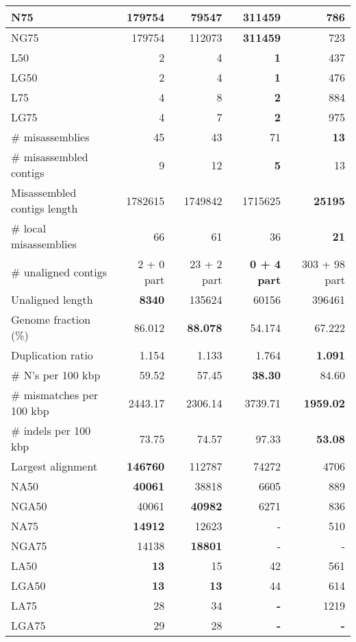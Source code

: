 \documentclass[12pt,a4paper]{article}
\begin{document}
\begin{table}[ht]
\begin{center}
\begin{tabular}{|l*{4}{|r}|}
N75 & 179754 & 79547 & {\bf 311459} & 786 \\ \hline
NG75 & 179754 & 112073 & {\bf 311459} & 723 \\ \hline
L50 & 2 & 4 & {\bf 1} & 437 \\ \hline
LG50 & 2 & 4 & {\bf 1} & 476 \\ \hline
L75 & 4 & 8 & {\bf 2} & 884 \\ \hline
LG75 & 4 & 7 & {\bf 2} & 975 \\ \hline
\# misassemblies & 45 & 43 & 71 & {\bf 13} \\ \hline
\# misassembled contigs & 9 & 12 & {\bf 5} & 13 \\ \hline
Misassembled contigs length & 1782615 & 1749842 & 1715625 & {\bf 25195} \\ \hline
\# local misassemblies & 66 & 61 & 36 & {\bf 21} \\ \hline
\# unaligned contigs & 2 + 0 part & 23 + 2 part & {\bf 0 + 4 part} & 303 + 98 part \\ \hline
Unaligned length & {\bf 8340} & 135624 & 60156 & 396461 \\ \hline
Genome fraction (\%) & 86.012 & {\bf 88.078} & 54.174 & 67.222 \\ \hline
Duplication ratio & 1.154 & 1.133 & 1.764 & {\bf 1.091} \\ \hline
\# N's per 100 kbp & 59.52 & 57.45 & {\bf 38.30} & 84.60 \\ \hline
\# mismatches per 100 kbp & 2443.17 & 2306.14 & 3739.71 & {\bf 1959.02} \\ \hline
\# indels per 100 kbp & 73.75 & 74.57 & 97.33 & {\bf 53.08} \\ \hline
Largest alignment & {\bf 146760} & 112787 & 74272 & 4706 \\ \hline
NA50 & {\bf 40061} & 38818 & 6605 & 889 \\ \hline
NGA50 & 40061 & {\bf 40982} & 6271 & 836 \\ \hline
NA75 & {\bf 14912} & 12623 & - & 510 \\ \hline
NGA75 & 14138 & {\bf 18801} & - & - \\ \hline
LA50 & {\bf 13} & 15 & 42 & 561 \\ \hline
LGA50 & {\bf 13} & {\bf 13} & 44 & 614 \\ \hline
LA75 & 28 & 34 & {\bf -} & 1219 \\ \hline
LGA75 & 29 & 28 & {\bf -} & {\bf -} \\ \hline
\end{tabular}
\end{center}
\end{table}
\end{document}
